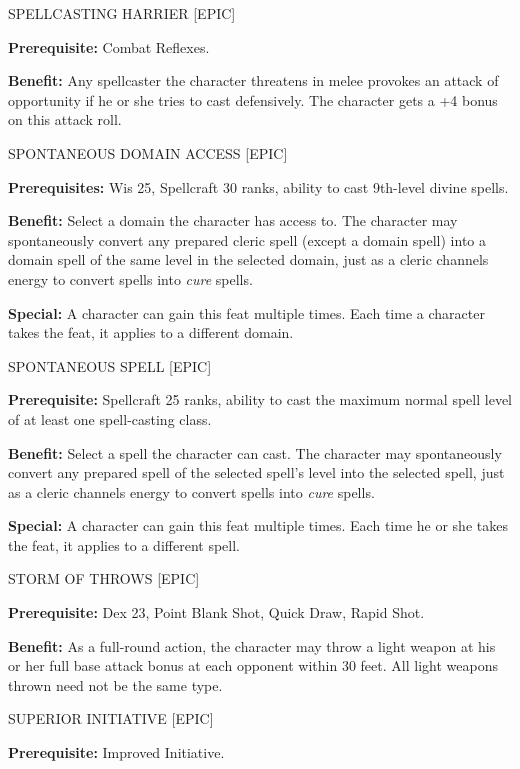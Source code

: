 \documentclass{article}
\begin{document}
\vspace{12pt}
SPELLCASTING HARRIER [EPIC] 

\textbf{Prerequisite:} Combat Reflexes. 

\textbf{Benefit:} Any spellcaster the character threatens in melee provokes an 
attack of opportunity if he or she tries to cast defensively.  The character gets 
a +4 bonus on this attack roll.

\vspace{12pt}
SPONTANEOUS DOMAIN ACCESS [EPIC]

\textbf{Prerequisites:} Wis 25, Spellcraft 30 ranks, ability to cast 9th-level 
divine spells. 

\textbf{Benefit:} Select a domain the character has access to. The character may 
spontaneously convert any prepared cleric spell (except a domain spell) into a 
domain spell of the same level in the selected domain, just as a cleric channels 
energy to convert spells into \textit{cure }spells. 

\textbf{Special:} A character can gain this feat multiple times. Each time a character 
takes the feat, it applies to a different domain. 

\vspace{12pt}
SPONTANEOUS SPELL [EPIC]

\textbf{Prerequisite:} Spellcraft 25 ranks, ability to cast the maximum normal 
spell level of at least one spell-casting class. 

\textbf{Benefit:} Select a spell the character can cast. The character may spontaneously 
convert any prepared spell of the selected spell's level into the selected spell, 
just as a cleric channels energy to convert spells into \textit{cure }spells. 

\textbf{Special:} A character can gain this feat multiple times. Each time he or 
she takes the feat, it applies to a different spell. 

\vspace{12pt}
STORM OF THROWS [EPIC] 

\textbf{Prerequisite:} Dex 23, Point Blank Shot, Quick Draw, Rapid Shot. 

\textbf{Benefit:} As a full-round action, the character may throw a light weapon 
at his or her full base attack bonus at each opponent within 30 feet. All light 
weapons thrown need not be the same type. 

\vspace{12pt}
SUPERIOR INITIATIVE [EPIC] 

\textbf{Prerequisite:} Improved Initiative. 
\end{document}
